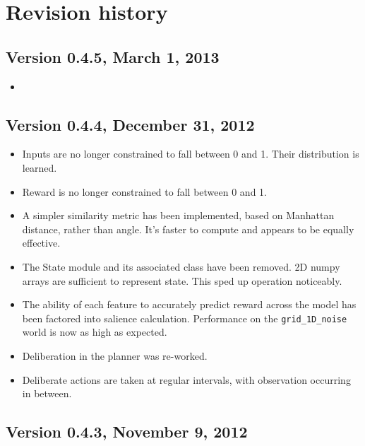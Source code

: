 \chapter{Revision history}

\section*{Version 0.4.5, March 1, 2013}

\begin{itemize}
\item 
\end{itemize}


\section*{Version 0.4.4, December 31, 2012}

\begin{itemize}
\item Inputs are no longer constrained to fall between 0 and 1. Their distribution is learned.
\item Reward is no longer constrained to fall between 0 and 1.
\item A simpler similarity metric has been implemented, based on Manhattan distance, rather than angle. It's faster to compute and appears to be equally effective.
\item The State module and its associated class have been removed. 2D numpy arrays are sufficient to represent state. This sped up operation noticeably.
\item The ability of each feature to accurately predict reward across the model has been factored into salience calculation. Performance on the \texttt{grid\_1D\_noise} world is now as high as expected.
\item Deliberation in the planner was re-worked.
\item Deliberate actions are taken at regular intervals, with observation occurring in between. 
\end{itemize}

\section*{Version 0.4.3, November 9, 2012}

